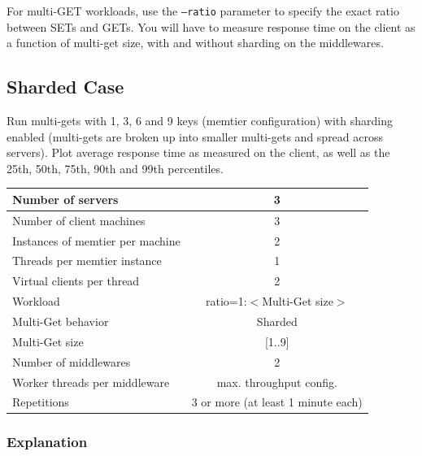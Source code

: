 \documentclass[11pt,a4paper]{article}
\begin{document}
For multi-GET workloads, use the \texttt{--ratio} parameter to specify the exact ratio between SETs and GETs. You will have to measure response time on the client as a function of multi-get size, with and without sharding on the middlewares.

\subsection{Sharded Case}

Run multi-gets with 1, 3, 6 and 9 keys (memtier configuration) with sharding enabled (multi-gets are broken up into smaller multi-gets and spread across servers). Plot average response time as measured on the client, as well as the 25th, 50th, 75th, 90th and 99th percentiles.

\begin{center}
	\scriptsize{
		\begin{tabular}{|l|c|}
			\hline Number of servers                & 3                       \\ 
			\hline Number of client machines        & 3                       \\ 
			\hline Instances of memtier per machine & 2                       \\ 
			\hline Threads per memtier instance     & 1                       \\
			\hline Virtual clients per thread       & 2     		            \\ 
			\hline Workload                         & ratio=1:$<$Multi-Get size$>$             \\
			\hline Multi-Get behavior               & Sharded                 \\
			\hline Multi-Get size                   & [1..9]                  \\
			\hline Number of middlewares            & 2                       \\
			\hline Worker threads per middleware    & max. throughput config. \\
			\hline Repetitions                      & 3 or more (at least 1 minute each)               \\ 
			\hline 
		\end{tabular}
	} 
\end{center}

\subsubsection{Explanation}
\end{document}
